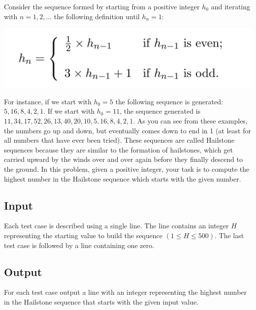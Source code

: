 Consider the sequence formed by starting from a positive integer $h_0$ and
iterating with $n = 1, 2, ...$ the following definition until $h_n = 1$:

\begin{center}
\includegraphics[scale=0.25]{problems/hailstone/imagens/hn.png}
\end{center}

For instance, if we start with $h_0 = 5$ the following sequence is
generated: $5, 16, 8, 4, 2, 1$. If we start with $h_0 = 11$, the sequence
generated is $11, 34, 17, 52, 26, 13, 40, 20, 10, 5, 16, 8, 4, 2, 1.$ As you
can see from these examples, the numbers go up and down, but eventually
comes down to end in 1 (at least for all numbers that have ever been tried).
These sequences are called Hailstone sequences because they are similar to
the formation of hailstones, which get carried upward by the winds over and
over again before they finally descend to the ground. In this problem, given
a positive integer, your task is to compute the highest number in the
Hailstone sequence which starts with the given number.

\subsection*{Input}

Each test case is described using a single line. The line contains an
integer $H$ representing the starting value to build the sequence $(1 \leq H
\leq 500)$. The last test case is followed by a line containing one zero.

\subsection*{Output}

For each test case output a line with an integer representing the highest
number in the Hailstone sequence that starts with the given input value.

